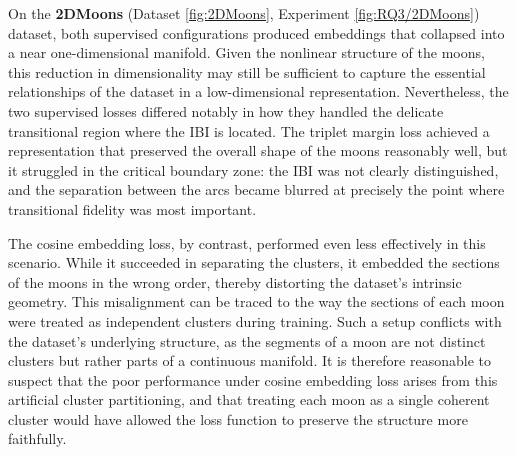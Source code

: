 On the \textbf{2DMoons} (Dataset \ref{fig:2DMoons}, Experiment \ref{fig:RQ3/2DMoons}) dataset, both supervised configurations produced embeddings that collapsed into a near one-dimensional manifold. Given the nonlinear structure of the moons, this reduction in dimensionality may still be sufficient to capture the essential relationships of the dataset in a low-dimensional representation. Nevertheless, the two supervised losses differed notably in how they handled the delicate transitional region where the IBI is located. The triplet margin loss achieved a representation that preserved the overall shape of the moons reasonably well, but it struggled in the critical boundary zone: the IBI was not clearly distinguished, and the separation between the arcs became blurred at precisely the point where transitional fidelity was most important.

The cosine embedding loss, by contrast, performed even less effectively in this scenario. While it succeeded in separating the clusters, it embedded the sections of the moons in the wrong order, thereby distorting the dataset’s intrinsic geometry. This misalignment can be traced to the way the sections of each moon were treated as independent clusters during training. Such a setup conflicts with the dataset’s underlying structure, as the segments of a moon are not distinct clusters but rather parts of a continuous manifold. It is therefore reasonable to suspect that the poor performance under cosine embedding loss arises from this artificial cluster partitioning, and that treating each moon as a single coherent cluster would have allowed the loss function to preserve the structure more faithfully.

